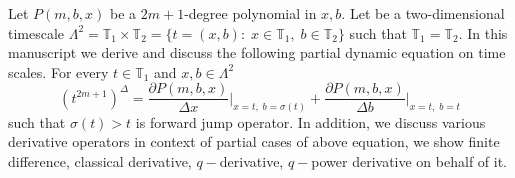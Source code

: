 Let $P(m,b,x)$ be a $2m+1$-degree polynomial in $x,b$.
Let be a two-dimensional timescale
$\Lambda^2 = \mathbb{T}_1 \times \mathbb{T}_2 = \{t=(x, b) \colon \; x\in\mathbb{T}_1, \; b\in\mathbb{T}_2 \}$
such that $\mathbb{T}_1 = \mathbb{T}_2$.
In this manuscript we derive and discuss the following partial dynamic equation on time scales.
For every $t\in\mathbb{T}_1$ and $x,b\in \Lambda^2$
\[
    (t^{2m+1})^{\Delta} =
    \frac{\partial P(m,b,x)}{\Delta x} \bigg |_{x = t, \; b = \sigma(t)} +
    \frac{\partial P(m,b,x)}{\Delta b}\bigg |_{x = t, \; b = t}
\]
such that $\sigma(t) > t$ is forward jump operator.
In addition, we discuss various derivative operators in context of partial cases of above equation,
we show finite difference, classical derivative, $q-$derivative, $q-$power derivative on behalf of it.
